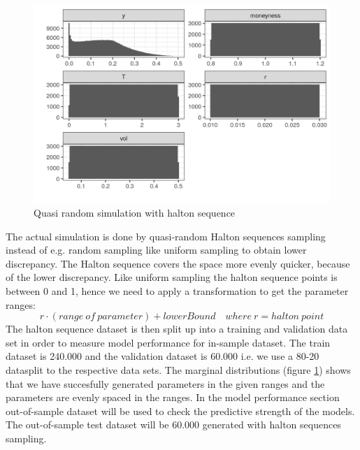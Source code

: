 \begin{figure}[H]
\centering
\includegraphics{Figures/marginalEuroCall.png}
\decoRule
\caption[Marginal distributions for european call]{Quasi random simulation with halton sequence}
\label{fig:marginalEuro}
\end{figure}


The actual simulation is done by quasi-random Halton sequences sampling instead of e.g. random sampling like uniform sampling to obtain lower discrepancy. The Halton sequence covers the space more evenly quicker, because of the lower discrepancy. Like uniform sampling the halton sequence points is between 0 and 1, hence we need to apply a transformation to get the parameter ranges:
$$r \cdot (range \ of \ parameter) + lowerBound \quad where \ r=halton \ point$$
The halton sequence dataset is then split up into a training and validation data set in order to measure model performance for in-sample dataset. The train dataset is 240.000 and the validation dataset is 60.000 i.e. we use a 80-20 datasplit to the respective data sets. The marginal distributions (figure \ref{fig:marginalEuro}) shows that we have succesfully generated parameters in the given ranges and the parameters are evenly spaced in the ranges. In the model performance section out-of-sample dataset will be used to check the predictive strength of the models. The out-of-sample test dataset will be 60.000 generated with halton sequences sampling.



